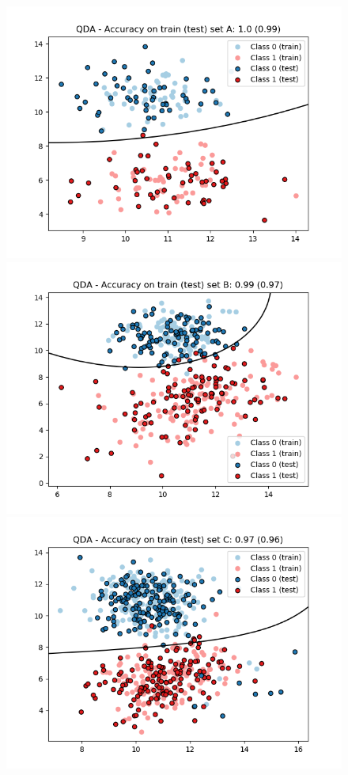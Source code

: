\documentclass[a4paper, 11pt]{report}
\begin{document}
\begin{enumerate}[label=\alph*]
        \begin{figure}[!htb]
          \includegraphics[width=\linewidth]{./images/QDA_A.png}
          \label{fig:qda_a}
        \endminipage\hfill
          \includegraphics[width=\linewidth]{./images/QDA_B.png}
          \label{fig:qda_b}
        \endminipage\hfill
          \includegraphics[width=\linewidth]{./images/QDA_C.png}

\end{figure}
\end{enumerate}
\end{document}

